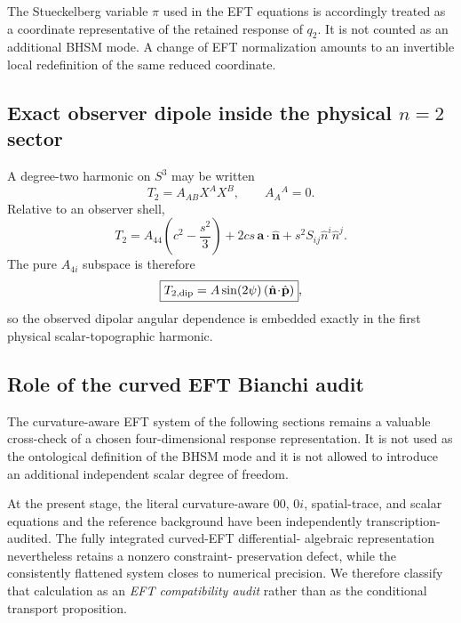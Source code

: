 The Stueckelberg variable $\pi$ used in the EFT equations is accordingly
treated as a coordinate representative of the retained response of $q_2$.
It is not counted as an additional BHSM mode.  A change of EFT normalization
amounts to an invertible local redefinition of the same reduced coordinate.

\subsection{Exact observer dipole inside the physical $n=2$ sector}

A degree-two harmonic on $S^3$ may be written
\begin{equation}
T_2=A_{AB}X^AX^B,\qquad A_A{}^A=0 .
\end{equation}
Relative to an observer shell,
\begin{equation}
T_2
=
A_{44}\left(c^2-\frac{s^2}{3}\right)
+
2cs\,\mathbf a\!\cdot\!\hat{\mathbf n}
+
s^2 S_{ij}\hat n^i\hat n^j .
\end{equation}
The pure $A_{4i}$ subspace is therefore
\begin{equation}
\boxed{
T_{2,\rm dip}
=
A\sin(2\psi)
\left(
\hat{\mathbf n}\!\cdot\!\hat{\mathbf p}
\right)
},
\label{eq:bhsm-n2-exact-dipole}
\end{equation}
so the observed dipolar angular dependence is embedded exactly in the first
physical scalar-topographic harmonic.

\subsection{Role of the curved EFT Bianchi audit}

The curvature-aware EFT system of the following sections remains a valuable
cross-check of a chosen four-dimensional response representation.  It is not
used as the ontological definition of the BHSM mode and it is not allowed to
introduce an additional independent scalar degree of freedom.

At the present stage, the literal curvature-aware $00$, $0i$, spatial-trace,
and scalar equations and the reference background have been independently
transcription-audited.  The fully integrated curved-EFT differential-
algebraic representation nevertheless retains a nonzero constraint-
preservation defect, while the consistently flattened system closes to
numerical precision.  We therefore classify that calculation as an
\emph{EFT compatibility audit} rather than as the conditional transport proposition.

